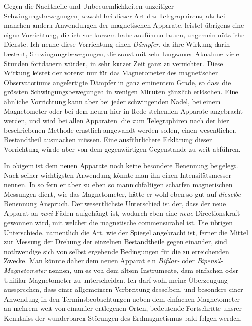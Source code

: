 Gegen die Nachtheile und Unbequemlichkeiten unzeitiger Schwingungsbewegungen, sowohl bei dieser Art des Telegraphirens, als bei manchen andern Anwendungen der magnetischen Apparate, leistet übrigens eine eigne Vorrichtung, die ich vor kurzem habe ausführen lassen, ungemein nützliche Dienste. Ich nenne diese Vorrichtung einen \textit{Dämpfer}, da ihre Wirkung darin besteht, Schwingungsbewegungen, die sonst mit sehr langsamer Abnahme viele Stunden fortdauern würden, in sehr kurzer Zeit ganz zu vernichten. Diese Wirkung leistet der vorerst nur für das Magnetometer des magnetischen Observatoriums angefertigte Dämpfer in ganz eminentem Grade, so dass die grössten Schwingungsbewegungen in wenigen Minuten gänzlich erlöschen. Eine ähnliche Vorrichtung kann aber bei jeder schwingenden Nadel, bei einem Magnetometer oder bei dem neuen hier in Rede stehenden Apparate angebracht werden, und wird bei allen Apparaten, die zum Telegraphiren nach der hier beschriebenen Methode ernstlich angewandt werden sollen, einen wesentlichen Bestandtheil ausmachen müssen. Eine ausführlichere Erklärung dieser Vorrichtung würde aber von dem gegenwärtigen Gegenstande zu weit abführen.

\par\clearpage
{}
In obigem ist dem neuen Apparate noch keine besondere Benennung beigelegt. Nach seiner wichtigsten Anwendung könnte man ihn einen Intensitätsmesser nennen. In so fern er aber zu eben so mannichfaltigen scharfen magnetischen Messungen dient, wie das Magnetometer, hätte er wohl eben so gut auf \textit{dieselbe} Benennung Anspruch. Der wesentlichste Unterschied ist der, dass der neue Apparat an \textit{zwei} Fäden aufgehängt ist, wodurch eben eine \textit{neue} Directionskraft gewonnen wird, mit welcher die magnetische commensurabel ist. Die übrigen Unterschiede, namentlich die Art, wie der Spiegel angebracht ist, ferner die Mittel zur Messung der Drehung der einzelnen Bestandtheile gegen einander, sind nothwendige sich von selbst ergebende Bedingungen für die zu erreichenden Zwecke. Man könnte daher dem neuen Apparat ein \textit{Bifilar-} oder \textit{Bipensil-Magnetometer} nennen, um es von dem ältern Instrumente, dem einfachen oder Unifilar-Magnetometer zu unterscheiden. Ich darf wohl meine Überzeugung aussprechen, dass einer allgemeinern Verbreitung desselben, und besonders einer Anwendung in den Terminsbeobachtungen neben dem einfachen Magnetometer an mehrern weit von einander entlegenen Orten, bedeutende Fortschritte unsrer Kenntniss der wunderbaren Störungen des Erdmagnetismus bald folgen werden.

